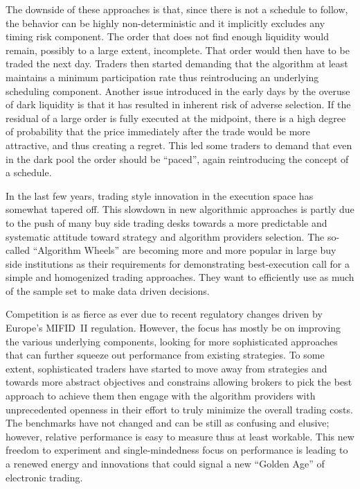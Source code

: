 The downside of these approaches is that, since there is not a schedule to follow, the behavior can be highly non-deterministic and it implicitly excludes any timing risk component. The order that does not find enough liquidity would remain, possibly to a large extent, incomplete. That order would then have to be traded the next day. Traders then started demanding that the algorithm at least maintains a minimum participation rate thus reintroducing an underlying scheduling component. Another issue introduced in the early days by the overuse of dark liquidity is that it has resulted in inherent risk of adverse selection. If the residual of a large order is fully executed at the midpoint, there is a high degree of probability that the price immediately after the trade would be more attractive, and thus creating a regret. This led some traders to demand that even in the dark pool the order should be ``paced'', again reintroducing the concept of a schedule.


In the last few years, trading style innovation in the execution space has somewhat tapered off. This slowdown in new algorithmic approaches is partly due to the push of many buy side trading desks towards a more predictable and systematic attitude toward strategy and algorithm providers selection. The so-called ``Algorithm Wheels'' are becoming more and more popular in large buy side institutions as their requirements for demonstrating best-execution call for a simple and homogenized trading approaches. They want to efficiently use as much of the sample set to make data driven decisions. 


Competition is as fierce as ever due to recent regulatory changes driven by Europe's MIFID~II regulation. However, the focus has mostly be on improving the various underlying components, looking for more sophisticated approaches that can further squeeze out performance from existing strategies. To some extent, sophisticated traders have started to move away from strategies and towards more abstract objectives and constrains allowing brokers to pick the best approach to achieve them then engage with the algorithm providers with unprecedented openness in their effort to truly minimize the overall trading costs. The benchmarks have not changed and can be still as confusing and elusive; however, relative performance is easy to measure thus at least workable. This new freedom to experiment and single-mindedness focus on performance is leading to a renewed energy and innovations that could signal a new ``Golden Age'' of electronic trading.



